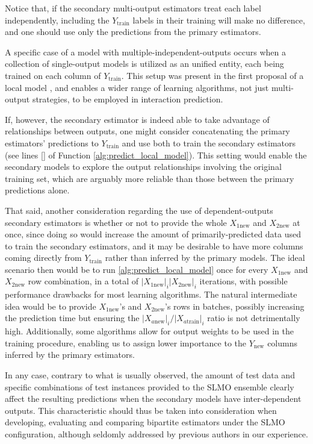 Notice that, if the secondary multi-output estimators treat each label independently, including the $Y_\text{train}$ labels in their training will make no difference, and one should use only the predictions from the primary estimators.

A specific case of a model with multiple-independent-outputs occurs when a collection of single-output models is utilized as an unified entity, each being trained on each column of $Y_\text{train}$. This setup was present in the first proposal of a local model \cite{}, and enables a wider range of learning algorithms, not just multi-output strategies, to be employed in interaction prediction.

If, however, the secondary estimator is indeed able to take advantage of relationships between outputs, one might consider concatenating the primary estimators' predictions to $Y_\text{train}$ and use both to train the secondary estimators (see lines \ref{} of Function \ref{alg:predict_local_model}). This setting would enable the secondary models to explore the output relationships involving the original training set, which are arguably more reliable than those between the primary predictions alone.

That said, another consideration regarding the use of dependent-outputs secondary estimators is whether or not to provide the whole $X_{1\text{new}}$ and $X_{2\text{new}}$ at once, since doing so would increase the amount of primarily-predicted data used to train the secondary estimators, and it may be desirable to have more columns coming directly from $Y_\text{train}$ rather than inferred by the primary models. The ideal scenario then would be to run \ref{alg:predict_local_model} once for every $X_{1\text{new}}$ and $X_{2\text{new}}$ row combination, in a total of $|X_{1\text{new}}|_i|X_{2\text{new}}|_i$ iterations, with possible performance drawbacks for most learning algorithms. The natural intermediate idea would be to provide $X_{1\text{new}}$'s and $X_{2\text{new}}$'s rows in batches, possibly increasing the prediction time but ensuring the $|X_{a\text{new}}|_i/|X_{a\text{train}}|_i$ ratio is not detrimentally high. Additionally, some algorithms allow for output weights to be used in the training procedure, enabling us to assign lower importance to the $Y_{\text{new}}$ columns inferred by the primary estimators.

In any case, contrary to what is usually observed, the amount of test data and specific combinations of test instances provided to the SLMO ensemble clearly affect the resulting predictions when the secondary models have inter-dependent outputs. This characteristic should thus be taken into consideration when developing, evaluating and comparing bipartite estimators under the SLMO configuration, although seldomly addressed by previous authors in our experience.%

